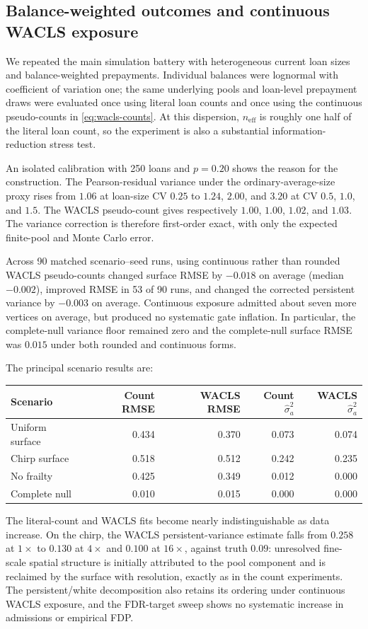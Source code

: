 \documentclass[11pt]{article}
\begin{document}
\subsection{Balance-weighted outcomes and continuous WACLS exposure}
\label{sec:wacls-sims}

We repeated the main simulation battery with heterogeneous current loan sizes
and balance-weighted prepayments.  Individual balances were lognormal with
coefficient of variation one; the same underlying pools and loan-level
prepayment draws were evaluated once using literal loan counts and once using
the continuous pseudo-counts in \eqref{eq:wacls-counts}.  At this dispersion,
$n_{\mathrm{eff}}$ is roughly one half of the literal loan count, so the
experiment is also a substantial information-reduction stress test.

An isolated calibration with 250 loans and $p=0.20$ shows the reason for the
construction.  The Pearson-residual variance under the ordinary-average-size
proxy rises from $1.06$ at loan-size CV $0.25$ to $1.24$, $2.00$, and $3.20$
at CV $0.5$, $1.0$, and $1.5$.  The WACLS pseudo-count gives respectively
$1.00$, $1.00$, $1.02$, and $1.03$.  The variance correction is therefore
first-order exact, with only the expected finite-pool and Monte Carlo error.

Across 90 matched scenario--seed runs, using continuous rather than rounded
WACLS pseudo-counts changed surface RMSE by $-0.018$ on average (median
$-0.002$), improved RMSE in 53 of 90 runs, and changed the corrected persistent
variance by $-0.003$ on average.  Continuous exposure admitted about seven more
vertices on average, but produced no systematic gate inflation.  In particular,
the complete-null variance floor remained zero and the complete-null surface
RMSE was $0.015$ under both rounded and continuous forms.

The principal scenario results are:
\begin{center}
\begin{tabular}{@{}lrrrr@{}}
\toprule
Scenario & Count RMSE & WACLS RMSE & Count $\hat\sigma_a^2$ & WACLS $\hat\sigma_a^2$\\
\midrule
Uniform surface & 0.434 & 0.370 & 0.073 & 0.074\\
Chirp surface & 0.518 & 0.512 & 0.242 & 0.235\\
No frailty & 0.425 & 0.349 & 0.012 & 0.000\\
Complete null & 0.010 & 0.015 & 0.000 & 0.000\\
\bottomrule
\end{tabular}
\end{center}
The literal-count and WACLS fits become nearly indistinguishable as data
increase.  On the chirp, the WACLS persistent-variance estimate falls from
$0.258$ at $1\times$ to $0.130$ at $4\times$ and $0.100$ at $16\times$, against
truth $0.09$: unresolved fine-scale spatial structure is initially attributed
to the pool component and is reclaimed by the surface with resolution, exactly
as in the count experiments.  The persistent/white decomposition also retains
its ordering under continuous WACLS exposure, and the FDR-target sweep shows no
systematic increase in admissions or empirical FDP.
\end{document}
